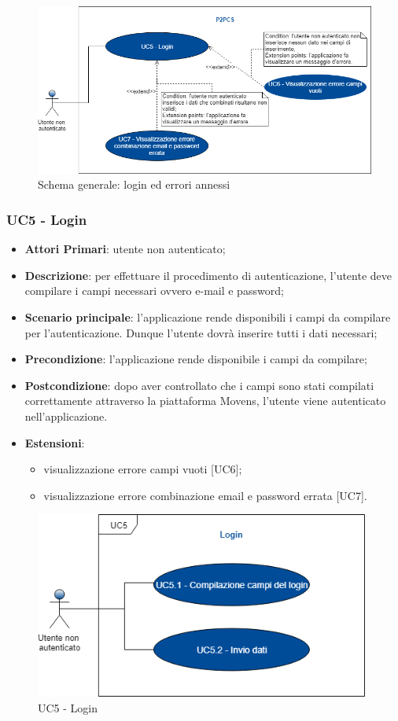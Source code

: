 \begin{figure}[h]
	\includegraphics[width=16cm]{res/images/Schemagenerale2.png}
	\centering
	\caption{Schema generale: login ed errori annessi}
\end{figure}
\newpage
\subsubsection{UC5 - Login}
\begin{itemize}
	\item \textbf{Attori Primari}: utente non autenticato;
	\item \textbf{Descrizione}: per effettuare il procedimento di autenticazione, l'utente deve compilare i campi necessari ovvero e-mail e password;
	\item \textbf{Scenario principale}: l'applicazione rende disponibili i campi da compilare per l'autenticazione. Dunque l'utente dovrà inserire tutti i dati necessari;
	\item \textbf{Precondizione}: l'applicazione rende disponibile i campi da compilare;
	\item \textbf{Postcondizione}: dopo aver controllato che i campi sono stati compilati correttamente attraverso la piattaforma Movens\glo, l'utente viene autenticato nell'applicazione.
	\item \textbf{Estensioni}:
		\begin{itemize}
			\item visualizzazione errore campi vuoti [UC6];
			\item visualizzazione errore combinazione email e password errata [UC7].
		\end{itemize}	
\end{itemize}
\begin{figure}[h]
	\includegraphics[width=11cm]{res/images/UC5Login.png}
	\centering
	\caption{UC5 - Login}
\end{figure}
\newpage
